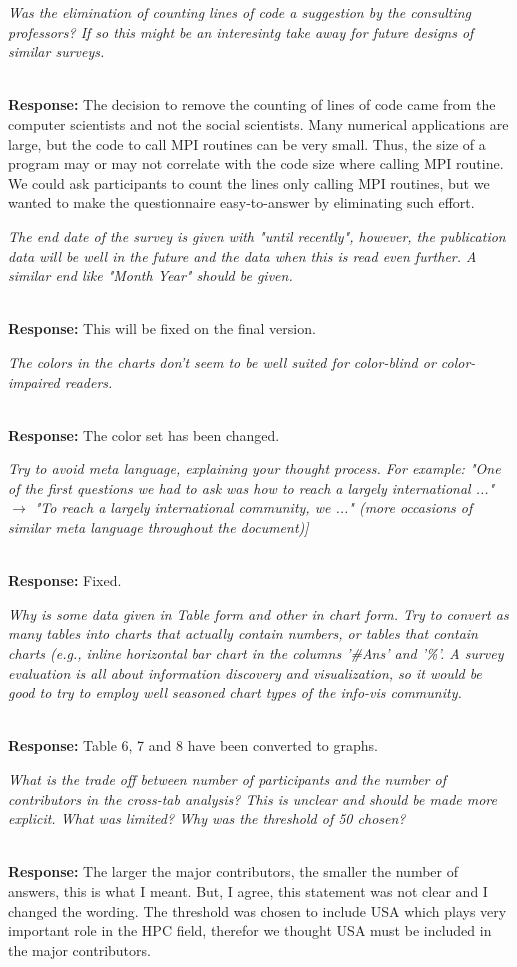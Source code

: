 \documentclass[11pt]{article}
\newcommand{\iresponse}[2]{{\item \em #1}\\%
  {\bf Response:} #2}
\begin{document}
\begin{enumerate}
\iresponse{Was the elimination of counting lines of code a suggestion
  by the consulting professors? If so this might be an interesintg
  take away for future designs of similar surveys.}
{
The decision to remove the counting of lines of code came from the
computer scientists and not the social scientists.
Many numerical applications are large, but the
code to call MPI routines can be very small. Thus, the size of a
program may or may not correlate with the code size where calling MPI
routine. We could ask participants to count the lines only calling MPI
routines, but we wanted to make the questionnaire easy-to-answer by
eliminating such effort.
}

\iresponse{The end date of the survey is given with "until recently",
  however, the publication data will be well in the future and the
  data when this is read even further. A similar end like "Month Year"
  should be given.}
{This will be fixed on the final version.}

\iresponse{The colors in the charts don't seem to be well suited for
  color-blind or color-impaired readers.}
{The color set has been changed.}

\iresponse{Try to avoid meta language, explaining your thought
  process. For example: "One of the first questions we had to ask was
  how to reach a largely international ..."  $\to$ "To reach a largely
  international community, we ..." (more occasions of similar meta
  language throughout the document)]}
{Fixed.}

\iresponse{Why is some data given in Table form and other in chart
  form. Try to convert as many tables into charts that actually
  contain numbers, or tables that contain charts (e.g., inline
  horizontal bar chart in the columns '\#Ans' and '\%'. A survey
  evaluation is all about information discovery and visualization, so
  it would be good to try to employ well seasoned chart types of the
  info-vis community.}
{Table 6, 7 and 8 have been converted to graphs.}

\iresponse{What is the trade off between number of participants and
  the number of contributors in the cross-tab analysis? This is
  unclear and should be made more explicit. What was limited? Why was
  the threshold of 50 chosen?}
{The larger the major contributors, the smaller the number of
  answers, this is what I meant. But, I agree, this statement was not
  clear and I changed the wording.  The threshold was chosen to
  include USA which plays very important role in the HPC field,
  therefor we thought USA must be included in the major contributors.}


\end{enumerate}
\end{document}
